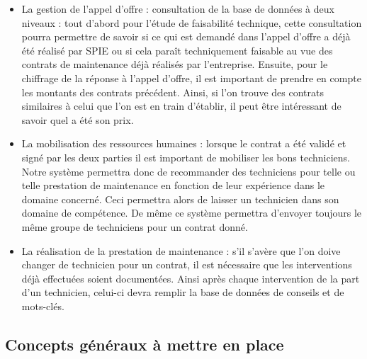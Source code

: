 \begin{itemize}
\item La gestion de l'appel d'offre : consultation de la base de données à deux niveaux : tout d'abord pour l'étude de faisabilité technique, cette consultation pourra permettre de savoir si ce qui est demandé dans l'appel d'offre a déjà été réalisé par SPIE ou si cela paraît techniquement faisable au vue des contrats de maintenance déjà réalisés par l'entreprise. Ensuite, pour le chiffrage de la réponse à l'appel d'offre, il est important de prendre en compte les montants des contrats précédent. Ainsi, si l'on trouve des contrats similaires à celui que l'on est en train d'établir, il peut être intéressant de savoir quel a été son prix.
\item La mobilisation des ressources humaines : lorsque le contrat a été validé et signé par les deux parties il est important de mobiliser les bons techniciens. Notre système permettra donc de recommander des techniciens pour telle ou telle prestation de maintenance en fonction de leur expérience dans le domaine concerné. Ceci permettra alors de laisser un technicien dans son domaine de compétence. De même ce système permettra d'envoyer toujours le même groupe de techniciens pour un contrat donné.
\item La réalisation de la prestation de maintenance : s'il s'avère que l'on doive changer de technicien pour un contrat, il est nécessaire que les interventions déjà effectuées soient documentées. Ainsi après chaque intervention de la part d'un technicien, celui-ci devra remplir la base de données de conseils et de mots-clés.
\end{itemize}

\subsection {Concepts généraux à mettre en place}

